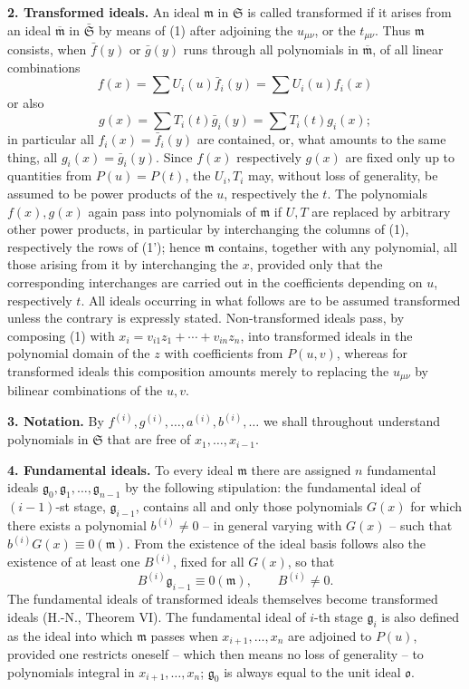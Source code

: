 \documentclass[11pt]{article}
\providecommand{\frakS}{\mathfrak S}
\providecommand{\frakm}{\mathfrak m}
\providecommand{\frakg}{\mathfrak g}
\providecommand{\frako}{\mathfrak o}
\providecommand{\barfrakm}{\overline{\mathfrak m}}
\providecommand{\frako}{\mathfrak o}
\providecommand{\frakS}{\mathfrak S}
\begin{document}
\textbf{2. Transformed ideals.} An ideal $\frakm$ in $\frakS$ is called transformed if it arises from an ideal $\barfrakm$ in $\bar{\frakS}$ by means of (1) after adjoining the $u_{\mu\nu}$, or the $t_{\mu\nu}$. Thus $\frakm$ consists, when $\bar f(y)$ or $\bar g(y)$ runs through all polynomials in $\barfrakm$, of all linear combinations
\[
 f(x)=\sum U_i(u)\bar f_i(y)=\sum U_i(u)f_i(x)
\]
or also
\[
 g(x)=\sum T_i(t)\bar g_i(y)=\sum T_i(t)g_i(x);
\]
in particular all $f_i(x)=\bar f_i(y)$ are contained, or, what amounts to the same thing, all $g_i(x)=\bar g_i(y)$. Since $f(x)$ respectively $g(x)$ are fixed only up to quantities from $P(u)=P(t)$, the $U_i,T_i$ may, without loss of generality, be assumed to be power products of the $u$, respectively the $t$. The polynomials $f(x),g(x)$ again pass into polynomials of $\frakm$ if $U,T$ are replaced by arbitrary other power products, in particular by interchanging the columns of (1), respectively the rows of (1'); hence $\frakm$ contains, together with any polynomial, all those arising from it by interchanging the $x$, provided only that the corresponding interchanges are carried out in the coefficients depending on $u$, respectively $t$. All ideals occurring in what follows are to be assumed transformed unless the contrary is expressly stated. Non-transformed ideals pass, by composing (1) with $x_i=v_{i1}z_1+\cdots+v_{in}z_n$, into transformed ideals in the polynomial domain of the $z$ with coefficients from $P(u,v)$, whereas for transformed ideals this composition amounts merely to replacing the $u_{\mu\nu}$ by bilinear combinations of the $u,v$.

\textbf{3. Notation.} By $f^{(i)},g^{(i)},\ldots,a^{(i)},b^{(i)},\ldots$ we shall throughout understand polynomials in $\frakS$ that are free of $x_1,\ldots,x_{i-1}$.

\textbf{4. Fundamental ideals.} To every ideal $\frakm$ there are assigned $n$ fundamental ideals $\frakg_0,\frakg_1,\ldots,\frakg_{n-1}$ by the following stipulation: the fundamental ideal of $(i-1)$-st stage, $\frakg_{i-1}$, contains all and only those polynomials $G(x)$ for which there exists a polynomial $b^{(i)}\ne 0$ -- in general varying with $G(x)$ -- such that $b^{(i)}G(x)\equiv0(\frakm)$. From the existence of the ideal basis follows also the existence of at least one $B^{(i)}$, fixed for all $G(x)$, so that
{\let\veqno\leqno\begin{equation}
 B^{(i)}\frakg_{i-1}\equiv0(\frakm),\qquad B^{(i)}\ne0 . \tag{2}
\end{equation}}
The fundamental ideals of transformed ideals themselves become transformed ideals (H.-N., Theorem VI). The fundamental ideal of $i$-th stage $\frakg_i$ is also defined as the ideal into which $\frakm$ passes when $x_{i+1},\ldots,x_n$ are adjoined to $P(u)$, provided one restricts oneself -- which then means no loss of generality -- to polynomials integral in $x_{i+1},\ldots,x_n$; $\frakg_0$ is always equal to the unit ideal $\frako$.
\end{document}

